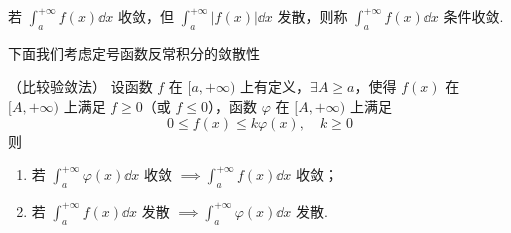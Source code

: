 \begin{definition}
	若 $\displaystyle\int_a^{+\infty} f(x)\dd x$ 收敛，但 $\displaystyle\int_a^{+\infty} |f(x)|\dd x$ 发散，则称 $\displaystyle\int_a^{+\infty} f(x)\dd x$ 条件收敛.
	
\end{definition}
下面我们考虑定号函数反常积分的敛散性
\begin{proposition}（比较验敛法）\label{比较验敛法}
	设函数 $f$ 在 $[a,+\infty)$ 上有定义，$\exists A \ge a$，使得 $f(x)$ 在 $[A,+\infty)$ 上满足 $f \ge 0$（或 $f \le 0$），函数 $\varphi$ 在 $[A,+\infty)$ 上满足
	\[
	0 \le f(x) \le k \varphi(x), \quad k \ge 0
	\]
	则
	\begin{enumerate}
		\item 若 $\displaystyle\int_a^{+\infty} \varphi(x)\dd x$ 收敛 $\implies \displaystyle\int_a^{+\infty} f(x)\dd x$ 收敛；
		\item 若 $\displaystyle\int_a^{+\infty} f(x)\dd x$ 发散 $\implies \displaystyle\int_a^{+\infty} \varphi(x)\dd x$ 发散.
	\end{enumerate}
	
	
\end{proposition}


